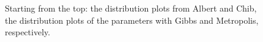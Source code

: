 \documentclass{article}
\begin{document}
\begin{figure}[htp]
    \caption{Starting from the top: the distribution plots from Albert and Chib, the distribution plots of the parameters with Gibbs and Metropolis, respectively.}
    \label{fig:dist}
\end{figure}



\end{document}
